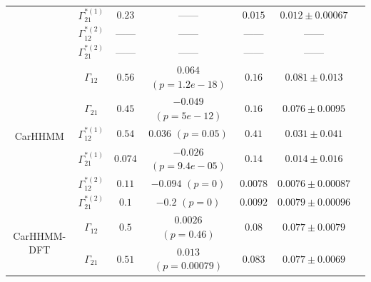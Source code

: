 \documentclass{article}
\begin{document}
\begin{center}
{\begin{tabular}{ccccccc}
                                     & $\Gamma^{*(1)}_{21}$          & $0.23$                         & ------                   & $0.015$                           & $0.012 \pm 0.00067$                             \\
                                     & $\Gamma^{*(2)}_{12}$          & ------                         & ------                   & ------                           & ------                                      \\
                                     & $\Gamma^{*(2)}_{21}$          & ------                         & ------                   & ------                           & ------                                      \\ \hline
        \multirow{6}{*}{CarHHMM}     & $\Gamma_{12}$                 & $0.56$                         & $0.064$ $(p=1.2e-18)$        & $0.16$                           & $0.081 \pm 0.013$                             \\
                                     & $\Gamma_{21}$                 & $0.45$                         & $-0.049$ $(p=5e-12)$        & $0.16$                           & $0.076 \pm 0.0095$                             \\
                                     & $\Gamma^{*(1)}_{12}$          & $0.54$                         & $0.036$ $(p=0.05)$        & $0.41$                           & $0.031 \pm 0.041$                             \\
                                     & $\Gamma^{*(1)}_{21}$          & $0.074$                         & $-0.026$ $(p=9.4e-05)$        & $0.14$                           & $0.014 \pm 0.016$                             \\
                                     & $\Gamma^{*(2)}_{12}$          & $0.11$                         & $-0.094$ $(p=0)$        & $0.0078$                           & $0.0076 \pm 0.00087$                             \\
                                     & $\Gamma^{*(2)}_{21}$          & $0.1$                         & $-0.2$ $(p=0)$        & $0.0092$                           & $0.0079 \pm 0.00096$                             \\ \hline
        \multirow{6}{*}{CarHHMM-DFT} & $\Gamma_{12}$                 & $0.5$                         & $0.0026$ $(p=0.46)$        & $0.08$                           & $0.077 \pm 0.0079$                             \\
                                     & $\Gamma_{21}$                 & $0.51$                         & $0.013$ $(p=0.00079)$        & $0.083$                           & $0.077 \pm 0.0069$                             \\

\end{tabular}}
\end{center}
\end{document}
